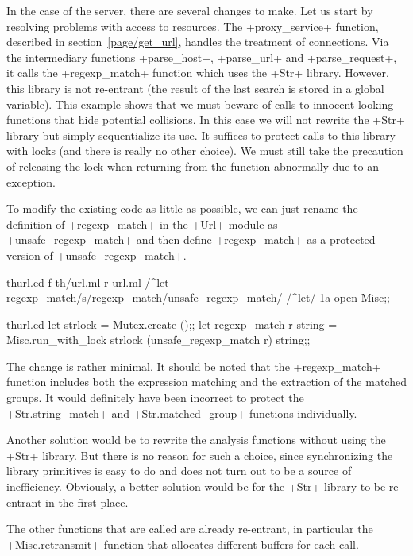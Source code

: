 In the case of the {\http} server, there are several changes to make.
Let us start by resolving problems with access to resources.  The
\ml+proxy_service+ function, described in section~\ref{page/get_url},
handles the treatment of connections.  Via the intermediary functions
\ml+parse_host+, \ml+parse_url+ and \ml+parse_request+, it calls the
\ml+regexp_match+ function which uses the \ml+Str+ library.  However,
this library is not re-entrant (the result of the last search is
stored in a global variable). This example shows that we must beware
of calls to innocent-looking functions that hide potential collisions.
In this case we will not rewrite the \ml+Str+ library but simply
sequentialize its use.  It suffices to protect calls to this library
with locks (and there is really no other choice). We must still take
the precaution of releasing the lock when returning from the function
abnormally due to an exception.

To modify the existing code as little as possible, we can just rename
the definition of \ml+regexp_match+ in the \ml+Url+ module as
\ml+unsafe_regexp_match+ and then define \ml+regexp_match+ as a
protected version of \ml+unsafe_regexp_match+.
%
\begin{codefile}{thurl.ed}
f th/url.ml
r url.ml
/^let regexp_match/s/regexp_match/unsafe_regexp_match/
/^let/-1a
open Misc;;
\end{codefile}
%
\begin{listingcodefile}{thurl.ed}
let strlock = Mutex.create ();;
let regexp_match r string =
  Misc.run_with_lock strlock (unsafe_regexp_match r) string;;
\end{listingcodefile}

The change is rather minimal.  It should be noted that the
\ml+regexp_match+ function includes both the expression matching and
the extraction of the matched groups.  It would definitely have been
incorrect to protect the \ml+Str.string_match+ and
\ml+Str.matched_group+ functions individually.

Another solution would be to rewrite the analysis functions without using
the \ml+Str+ library.  But there is no reason for such a choice, since
synchronizing the library primitives is easy to do and does not turn
out to be a source of inefficiency.  Obviously, a better solution
would be for the \ml+Str+ library to be re-entrant in the first place.

The other functions that are called are already re-entrant, in particular
the \ml+Misc.retransmit+ function that allocates different buffers for
each call.


